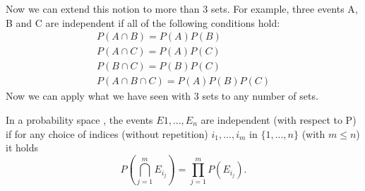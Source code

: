 Now we can extend this notion to more than 3 sets. For example, three events A, B and C are independent if all of the following conditions hold:
\begin{equation*}
    \begin{gathered}
        P(A \cap B) = P(A)P(B)\\
        P(A \cap C) = P(A)P(C)\\
        P(B \cap C) = P(B)P(C)\\
        P(A \cap B \cap C) = P(A)P(B)P(C)
    \end{gathered}
\end{equation*}
Now we can apply what we have seen with 3 sets to any number of sets.
\begin{definition}
    In a probability space \probspace, the events $E1,...,E_n$ are independent (with respect to P) if for any choice of indices (without repetition) $i_1,...,i_m$ in $\{1,...,n\}$ (with $m \le n$) it holds
    \begin{equation*}
        P\left(\bigcap_{j=1}^mE_{i_j}\right) = \prod_{j=1}^mP(E_{i_j}).
    \end{equation*}
\end{definition}
